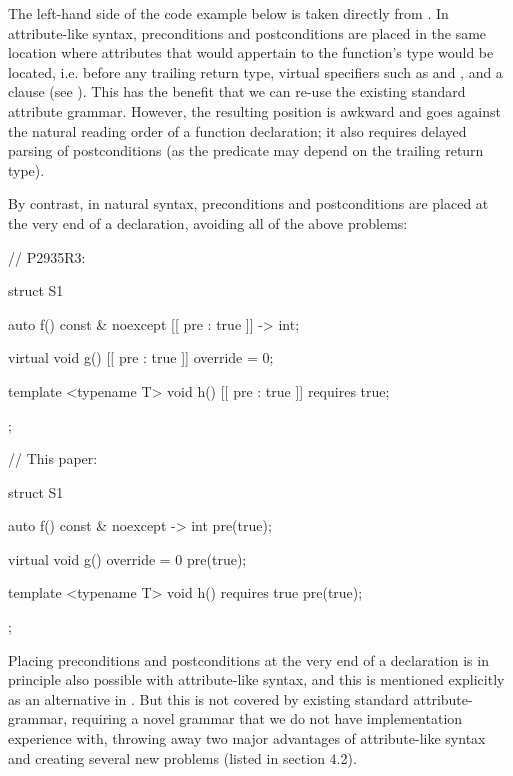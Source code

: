 The left-hand side of the code example below is taken directly from \cite{P2935R3}. In attribute-like syntax, preconditions and postconditions are placed in the same location where attributes that would appertain to the function’s type would be located, i.e. before any trailing return type, virtual specifiers such as  and , and a  clause (see \cite{P2935R3}). This has the benefit that we can re-use the existing standard attribute grammar. However, the resulting position is awkward and goes against the natural reading order of a function declaration; it also requires delayed parsing of postconditions (as the predicate may depend on the trailing return type).

By contrast, in natural syntax, preconditions and postconditions are placed at the very end of a declaration, avoiding all of the above problems:

\begin{minipage}{8cm}
\begin{codeblock}
// P2935R3:

struct S1
{
  auto f() const & noexcept
    [[ pre : true ]] -> int;
    
  virtual void g()
    [[ pre : true ]] override = 0;
  
  template <typename T>
  void h()
    [[ pre : true ]] requires true;
};
\end{codeblock}
\end{minipage}
\begin{minipage}{8cm}
\begin{codeblock}
// This paper:

struct S1
{
  auto f() const & noexcept -> int
    pre(true);
    
  virtual void g() override = 0
    pre(true);

  template <typename T>
  void h() requires true
    pre(true);
};
\end{codeblock}
\end{minipage}


Placing preconditions and postconditions at the very end of a declaration is in principle also possible with attribute-like syntax, and this is mentioned explicitly as an alternative in \cite{P2935R3}. But this is not covered by existing standard attribute-grammar, requiring a novel grammar that we do not have implementation experience with, throwing away two major advantages of attribute-like syntax and creating several new problems (listed in \cite{P2935R3} section 4.2).

